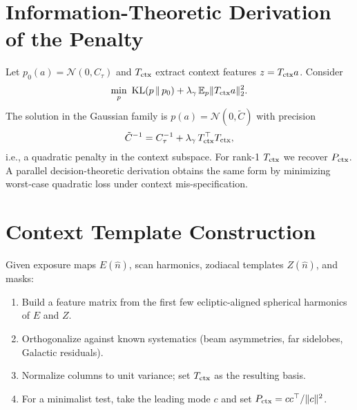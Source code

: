 \documentclass[11pt]{article}
\begin{document}
\section{Information-Theoretic Derivation of the Penalty}
\label{sec:it}
Let $p_0(a)=\mathcal N(0,C_\tau)$ and $T_{\rm ctx}$ extract context features $z=T_{\rm ctx}a$. Consider
\begin{equation}
\min_{p}\ \mathrm{KL}(p\,\|\,p_0)+\lambda_\gamma\,\mathbb E_p\|T_{\rm ctx}a\|_2^2.
\end{equation}
The solution in the Gaussian family is $p(a)=\mathcal N(0,\tilde C)$ with precision
\begin{equation}
\tilde C^{-1}=C_\tau^{-1}+\lambda_\gamma\,T_{\rm ctx}^\top T_{\rm ctx},
\end{equation}
i.e., a quadratic penalty in the context subspace. For rank-1 $T_{\rm ctx}$ we recover $P_{\rm ctx}$. A parallel decision-theoretic derivation obtains the same form by minimizing worst-case quadratic loss under context mis-specification.

\section{Context Template Construction}
\label{sec:templates}
Given exposure maps $E(\hat n)$, scan harmonics, zodiacal templates $Z(\hat n)$, and masks:
\begin{enumerate}[nosep]
\item Build a feature matrix from the first few ecliptic-aligned spherical harmonics of $E$ and $Z$.
\item Orthogonalize against known systematics (beam asymmetries, far sidelobes, Galactic residuals).
\item Normalize columns to unit variance; set $T_{\rm ctx}$ as the resulting basis.
\item For a minimalist test, take the leading mode $c$ and set $P_{\rm ctx}=cc^\top/\|c\|^2$.
\end{enumerate}
\end{document}
